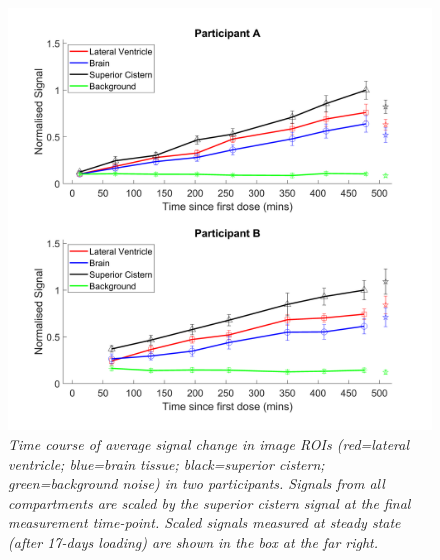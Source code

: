 \documentclass[class=article, crop=false]{standalone}
\begin{document}
\begin{figure}[H]
    \centering
    \includegraphics[width=1\textwidth]{Figures/D2O/ROI_Graph.png}
    \caption{\textit{Time course of average signal change in image ROIs (red=lateral ventricle; blue=brain tissue; black=superior cistern; green=background noise) in two participants. Signals from all compartments are scaled by the superior cistern signal at the final measurement time-point. Scaled signals measured at steady state (after 17-days loading) are shown in the box at the far right.}}
    \label{fig:D2O:ROI_Graph}
\end{figure}
\end{document}
